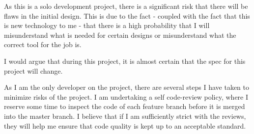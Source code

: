 As this is a solo development project, there is a significant risk that there will be flaws in the initial design. 
This is due to the fact - coupled with the fact that this is new technology to me - that there is a high probability that I will misunderstand what is needed for certain designs or misunderstand what the correct tool for the job is.

I would argue that during this project, it is almost certain that the spec for this project will change.

As I am the only developer on the project, there are several steps I have taken to minimize risks of the project.
I am undertaking a self code-review policy, where I reserve some time to inspect the code of each feature branch before it is merged into the master branch.
I believe that if I am sufficiently strict with the reviews, they will help me ensure that code quality is kept up to an acceptable standard.